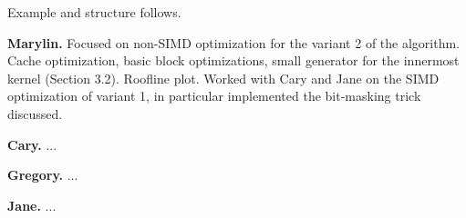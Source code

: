 \documentclass[letterpaper]{article}
\newcommand{\mypar}[1]{{\bf #1.}}
\begin{document}
Example and structure follows.

\mypar{Marylin} Focused on non-SIMD optimization for the variant 2 of the algorithm. Cache optimization, basic block optimizations, small generator for the innermost kernel (Section 3.2). Roofline plot. Worked with Cary and Jane on the SIMD optimization of variant 1, in particular implemented the bit-masking trick discussed.

\mypar{Cary} ...

\mypar{Gregory} ...

\mypar{Jane} ...



\end{document}
